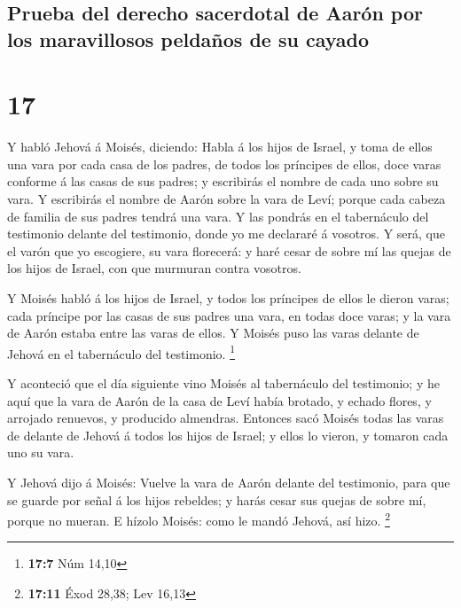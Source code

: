 \hypertarget{prueba-del-derecho-sacerdotal-de-aaruxf3n-por-los-maravillosos-peldauxf1os-de-su-cayado}{%
\subsection{Prueba del derecho sacerdotal de Aarón por los maravillosos
peldaños de su
cayado}\label{prueba-del-derecho-sacerdotal-de-aaruxf3n-por-los-maravillosos-peldauxf1os-de-su-cayado}}

\hypertarget{section-16}{%
\section{17}\label{section-16}}

 Y habló Jehová á Moisés, diciendo:  Habla á
los hijos de Israel, y toma de ellos una vara por cada casa de los
padres, de todos los príncipes de ellos, doce varas conforme á las casas
de sus padres; y escribirás el nombre de cada uno sobre su vara.
 Y escribirás el nombre de Aarón sobre la vara de Leví;
porque cada cabeza de familia de sus padres tendrá una vara.
 Y las pondrás en el tabernáculo del testimonio delante
del testimonio, donde yo me declararé á vosotros.  Y será,
que el varón que yo escogiere, su vara florecerá: y haré cesar de sobre
mí las quejas de los hijos de Israel, con que murmuran contra vosotros.

 Y Moisés habló á los hijos de Israel, y todos los
príncipes de ellos le dieron varas; cada príncipe por las casas de sus
padres una vara, en todas doce varas; y la vara de Aarón estaba entre
las varas de ellos.  Y Moisés puso las varas delante de
Jehová en el tabernáculo del testimonio. \footnote{\textbf{17:7} Núm
  14,10}

 Y aconteció que el día siguiente vino Moisés al
tabernáculo del testimonio; y he aquí que la vara de Aarón de la casa de
Leví había brotado, y echado flores, y arrojado renuevos, y producido
almendras.  Entonces sacó Moisés todas las varas de
delante de Jehová á todos los hijos de Israel; y ellos lo vieron, y
tomaron cada uno su vara.

 Y Jehová dijo á Moisés: Vuelve la vara de Aarón delante
del testimonio, para que se guarde por señal á los hijos rebeldes; y
harás cesar sus quejas de sobre mí, porque no mueran.  E
hízolo Moisés: como le mandó Jehová, así hizo. \footnote{\textbf{17:11}
  Éxod 28,38; Lev 16,13}


